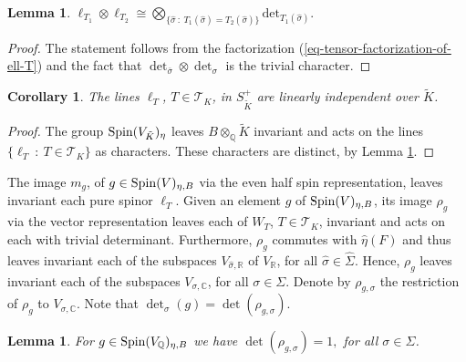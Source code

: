 \documentclass[12pt]{amsart}
\numberwithin{equation}{subsection}
\theoremstyle{plain}
\newtheorem{cor}[thm]{Corollary}
\newtheorem{lem}[thm]{Lemma}
\theoremstyle{definition}
\newtheorem{question}[thm]{Question}
\newcommand{\CC}{{\mathbb C}}
\newcommand{\QQ}{{\mathbb Q}}
\newcommand{\RR}{{\mathbb R}}
\newcommand{\T}{{\mathcal T}}
\newcommand{\Spin}{{\rm Spin}}
\begin{document}
{\begin{lem}
\label{lemma-tensor-product-of-two-ells}
${\displaystyle \ell_{T_1}\otimes\ell_{T_2}\cong \bigotimes_{\{\hat{\sigma} \ : \ T_1(\hat{\sigma})=T_2(\hat{\sigma})\}}\mbox{det}_{T_1(\hat{\sigma})}.
}$
\end{lem}

\begin{proof}
The statement follows from the factorization (\ref{eq-tensor-factorization-of-ell-T}) and the fact that $\det_{\bar{\sigma}}\otimes\det_\sigma$ is the trivial character.
\end{proof}

\begin{cor}
\label{cor-ell-T-are-linearly-independent}
The lines $\ell_T$, $T\in \T_K$, in $S^+_{\tilde{K}}$ are linearly independent over $\tilde{K}$.
\end{cor}


\begin{proof}
The group $\Spin(V_{\tilde{K}})_\eta$ leaves $B\otimes_\QQ\tilde{K}$ invariant and acts on the lines $\{\ell_T \ : \ T\in\T_K\}$ as characters. These characters are distinct, by 
Lemma \ref{lemma-tensor-product-of-two-ells}. 
\end{proof}


The image $m_g$, of $g\in \Spin(V)_{\eta,B}$ via the even half spin representation, leaves invariant each pure spinor $\ell_{T}$.
Given an element $g$ of $\Spin(V)_{\eta,B}$, its image $\rho_g$ via the vector representation
leaves each of $W_T$, $T\in\T_K$,  invariant and acts on each with trivial determinant. Furthermore, $\rho_g$ commutes with $\hat{\eta}(F)$ and thus leaves invariant each of the subspaces $V_{\hat{\sigma},\RR}$ of $V_\RR$, for all $\hat{\sigma}\in\hat{\Sigma}$. Hence, $\rho_g$ leaves invariant each of the subspaces $V_{\sigma,\CC}$, for all $\sigma\in \Sigma$. 
Denote by $\rho_{g,\sigma}$ the restriction of $\rho_g$ to $V_{\sigma,\CC}$.  Note that $\det_\sigma(g)=\det(\rho_{g,\sigma})$.

\begin{lem}
For $g\in\Spin(V_\QQ)_{\eta,B}$ we have $\det(\rho_{g,\sigma})=1,$ for all $\sigma\in\Sigma$.
\end{lem}

}
\end{document}
